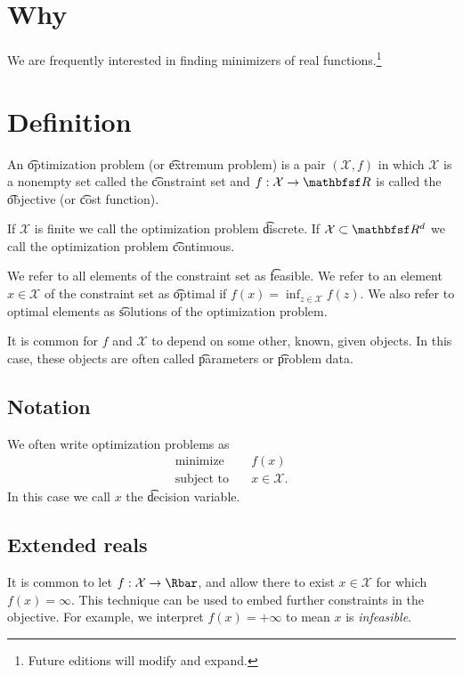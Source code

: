 
\section*{Why}

We are frequently interested in finding minimizers of real functions.\footnote{Future editions will modify and expand.}

\section*{Definition}

An \t{optimization problem} (or \t{extremum problem}) is a pair $(\mathcal{X} , f)$ in which $\mathcal{X} $ is a nonempty set called the \t{constraint set} and $f: \mathcal{X}  \to \R $ is called the \t{objective} (or \t{cost function}).

If $\mathcal{X} $ is finite we call the optimization problem \t{discrete}.
If $\mathcal{X}  \subset \R ^d$ we call the optimization problem \t{continuous}.

We refer to all elements of the constraint set as \t{feasible}.
We refer to an element $x \in \mathcal{X} $ of the constraint set as \t{optimal} if $f(x) = \inf_{z \in \mathcal{X} }f(z)$.
We also refer to optimal elements as \t{solutions} of the optimization problem.

It is common for $f$ and $\mathcal{X} $ to depend on some other, known, given objects.
In this case, these objects are often called \t{parameters} or \t{problem data}.

\subsection*{Notation}

We often write optimization problems as
\[
\begin{aligned}
\text{minimize}\quad & f(x) \\
\text{subject to}\quad & x \in \mathcal{X} .
\end{aligned}
\]
In this case we call $x$ the \t{decision variable}.

\subsection*{Extended reals}

It is common to let $f: \mathcal{X}  \to \Rbar$, and allow there to exist $x \in \mathcal{X} $ for which $f(x) = \infty$.
This technique can be used to embed further constraints in the objective.
For example, we interpret $f(x) = +\infty$ to mean $x$ is \textit{infeasible}.

